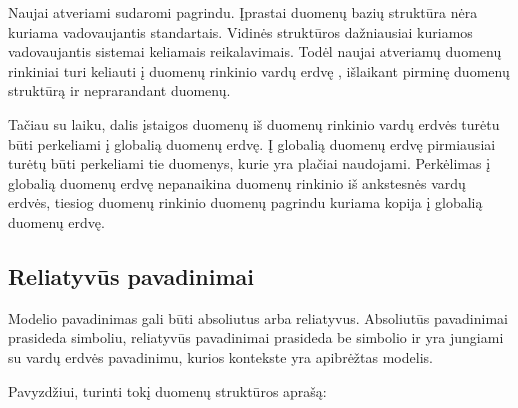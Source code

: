 \documentclass[letterpaper,10pt,lithuanian]{sphinxmanual}
\begin{document}
\sphinxAtStartPar
Naujai atveriami {\hyperref[\detokenize{savokos:term-DSA}]{}} sudaromi {\hyperref[\detokenize{savokos:term-SDSA}]{}}
pagrindu. Įprastai duomenų bazių struktūra nėra kuriama vadovaujantis
standartais. Vidinės struktūros dažniausiai kuriamos vadovaujantis sistemai
keliamais reikalavimais. Todėl naujai atveriamų duomenų rinkiniai turi keliauti
į duomenų rinkinio vardų erdvę ,
išlaikant pirminę duomenų struktūrą ir neprarandant duomenų.

\sphinxAtStartPar
Tačiau su laiku, dalis įstaigos duomenų iš duomenų rinkinio vardų erdvės turėtu
būti perkeliami į globalią duomenų erdvę. Į globalią duomenų erdvę pirmiausiai
turėtų būti perkeliami tie duomenys, kurie yra plačiai naudojami. Perkėlimas į
globalią duomenų erdvę nepanaikina duomenų rinkinio iš ankstesnės vardų erdvės,
tiesiog duomenų rinkinio duomenų pagrindu kuriama kopija į globalią duomenų
erdvę.


\subsection{Reliatyvūs pavadinimai}
\label{\detokenize{vardu-erdves:reliatyvus-pavadinimai}}\label{\detokenize{vardu-erdves:relative-model-names}}
\sphinxAtStartPar
Modelio pavadinimas gali būti absoliutus arba reliatyvus. Absoliutūs
pavadinimai prasideda \sphinxcode{\sphinxupquote{/}} simboliu, reliatyvūs pavadinimai prasideda be \sphinxcode{\sphinxupquote{/}}
simbolio ir yra jungiami su vardų erdvės pavadinimu, kurios kontekste yra
apibrėžtas modelis.

\sphinxAtStartPar
Pavyzdžiui, turinti tokį duomenų struktūros aprašą:
\end{document}
